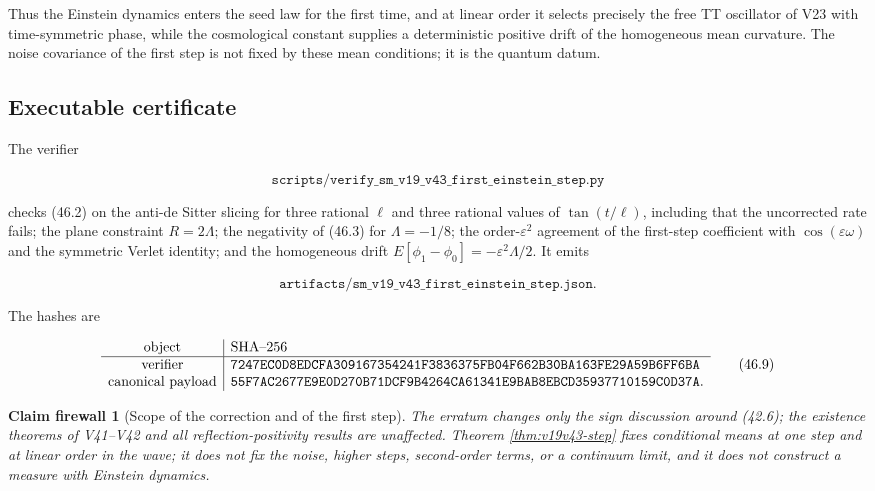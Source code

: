 \documentclass[11pt]{article}
\newtheorem{firewall}[theorem]{Claim firewall}
\theoremstyle{remark}
\begin{document}
Thus the Einstein dynamics enters the seed law for the first time, and
at linear order it selects precisely the free TT oscillator of V23 with
time-symmetric phase, while the cosmological constant supplies a
deterministic positive drift of the homogeneous mean curvature.  The
noise covariance of the first step is not fixed by these mean
conditions; it is the quantum datum.

\subsection{Executable certificate}

The verifier

\[
 \texttt{scripts/verify\_sm\_v19\_v43\_first\_einstein\_step.py}    \tag{46.7}
\]

checks (46.2) on the anti-de Sitter slicing for three rational
\(\ell\) and three rational values of \(\tan(t/\ell)\), including that
the uncorrected rate fails; the plane constraint \(R=2\Lambda\); the
negativity of (46.3) for \(\Lambda=-1/8\); the order-\(\varepsilon^2\)
agreement of the first-step coefficient with \(\cos(\varepsilon\omega)\)
and the symmetric Verlet identity; and the homogeneous drift
\(E[\phi_1-\phi_0]=-\varepsilon^2\Lambda/2\).  It emits

\[
 \texttt{artifacts/sm\_v19\_v43\_first\_einstein\_step.json}.        \tag{46.8}
\]

The hashes are

\[
\begin{array}{c|l}
\hbox{object}&\hbox{SHA--256}\\ \hline
\hbox{verifier}&
\texttt{7247EC0D8EDCFA309167354241F3836375FB04F662B30BA163FE29A59B6FF6BA}\\
\hbox{canonical payload}&
\texttt{55F7AC2677E9E0D270B71DCF9B4264CA61341E9BAB8EBCD35937710159C0D37A}.
\end{array}                                                     \tag{46.9}
\]

\begin{firewall}[Scope of the correction and of the first step]
\label{fire:v19v43}
The erratum changes only the sign discussion around (42.6); the
existence theorems of V41--V42 and all reflection-positivity results are
unaffected.  Theorem \ref{thm:v19v43-step} fixes conditional means at
one step and at linear order in the wave; it does not fix the noise,
higher steps, second-order terms, or a continuum limit, and it does not
construct a measure with Einstein dynamics.
\end{firewall}
\end{document}
